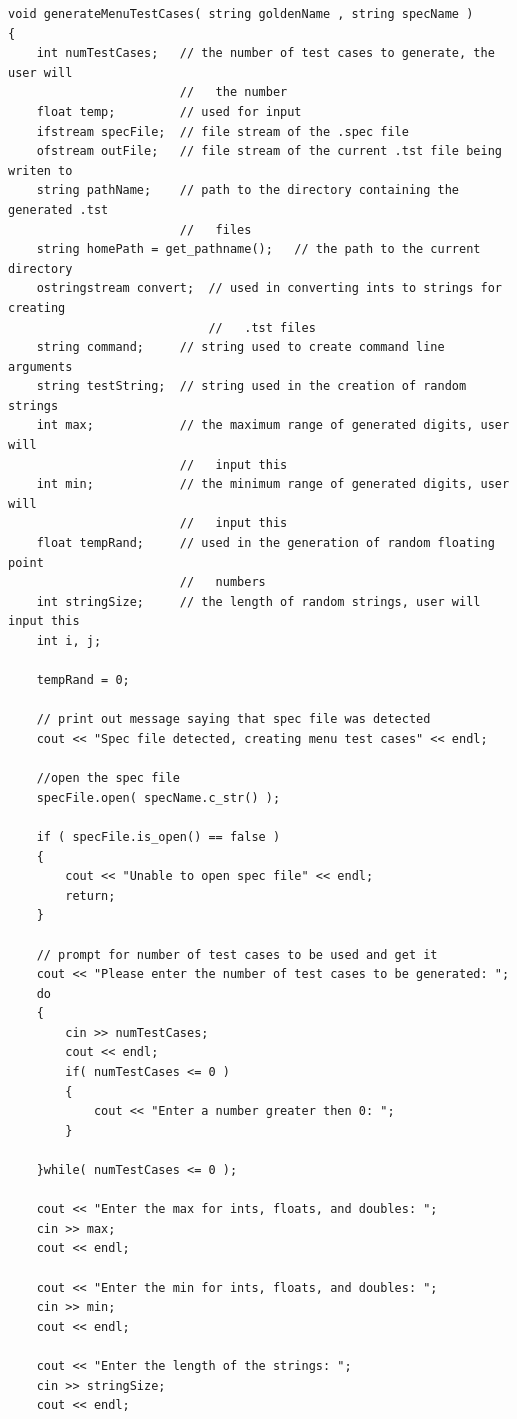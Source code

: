 \begin{lstlisting}
void generateMenuTestCases( string goldenName , string specName )
{
    int numTestCases;   // the number of test cases to generate, the user will
                        //   the number
    float temp;         // used for input
    ifstream specFile;  // file stream of the .spec file
    ofstream outFile;   // file stream of the current .tst file being writen to
    string pathName;    // path to the directory containing the generated .tst
                        //   files
    string homePath = get_pathname();   // the path to the current directory
    ostringstream convert;  // used in converting ints to strings for creating
                            //   .tst files
    string command;     // string used to create command line arguments
    string testString;  // string used in the creation of random strings
    int max;            // the maximum range of generated digits, user will 
                        //   input this
    int min;            // the minimum range of generated digits, user will
                        //   input this
    float tempRand;     // used in the generation of random floating point
                        //   numbers
    int stringSize;     // the length of random strings, user will input this
    int i, j;
    
    tempRand = 0;
    
    // print out message saying that spec file was detected
    cout << "Spec file detected, creating menu test cases" << endl;
    
    //open the spec file
    specFile.open( specName.c_str() );
    
    if ( specFile.is_open() == false )
    {
        cout << "Unable to open spec file" << endl;
        return;
    }
    
    // prompt for number of test cases to be used and get it
    cout << "Please enter the number of test cases to be generated: ";
    do
    {
        cin >> numTestCases;
        cout << endl;
        if( numTestCases <= 0 )
        {
            cout << "Enter a number greater then 0: ";
        }
        
    }while( numTestCases <= 0 );
    
    cout << "Enter the max for ints, floats, and doubles: ";
    cin >> max;
    cout << endl;
    
    cout << "Enter the min for ints, floats, and doubles: ";
    cin >> min;
    cout << endl;
    
    cout << "Enter the length of the strings: ";
    cin >> stringSize;
    cout << endl;
    

\end{lstlisting}
